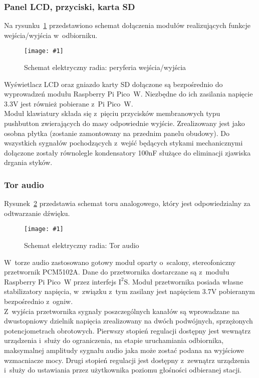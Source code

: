 \documentclass[polish]{aghengthesis}
\newcommand{\imgint}[4]{
	\begin{figure}[{#4}]
		\centering
		\texttt{[image: \#1]}
		\caption{#2}
		\label{#1}
	\end{figure}
}
\newcommand{\imgh}[3]{\imgint{#1}{#2}{#3}{H}}
\newcommand{\isqs}{$\text{I}^{2}\text{S}$}
\begin{document}
			\subsubsection{Panel LCD, przyciski, karta SD}
				Na rysunku~\ref{3/hw_kicad_sch_perip} przedstawiono schemat dołączenia modułów realizujących funkcje wejścia/wyjścia w~odbiorniku.
				\imgh{3/hw_kicad_sch_perip}{Schemat elektryczny radia: peryferia wejścia/wyjścia}{0.95}
				
				Wyświetlacz LCD oraz gniazdo karty SD dołączone są bezpośrednio do wyprowadzeń modułu Raspberry Pi Pico~W. Niezbędne do ich zasilania napięcie 3.3V jest również pobierane z~Pi Pico~W.
				$ $\\
				
				Moduł klawiatury składa się z~pięciu przycisków membranowych typu pushbutton zwierających do masy odpowiednie wyjście. Zrealizowany jest jako osobna płytka (zostanie zamontowany na przednim panelu obudowy).  Do wszystkich sygnałów pochodzących z~wejść będących stykami mechanicznymi dołączone zostały równolegle kondensatory 100nF służące do eliminacji zjawiska drgania styków.
				\pagebreak
				
			\subsubsection{Tor audio}
				Rysunek~\ref{3/hw_kicad_sch_audio} przedstawia schemat toru analogowego, który jest odpowiedzialny za odtwarzanie dźwięku.
				\imgh{3/hw_kicad_sch_audio}{Schemat elektryczny radia: Tor audio}{0.95}
				
				W~torze audio zastosowano gotowy moduł oparty o~scalony, stereofoniczny przetwornik PCM5102A\textsuperscript{\cite{hw_dac}}. Dane do przetwornika dostarczane są z~modułu Raspberry Pi Pico~W przez interfejs \isqs{}. Moduł przetwornika posiada własne stabilizatory napięcia, w~związku z~tym zasilany jest napięciem 3.7V pobieranym bezpośrednio z~ogniw.
				$ $\\
				
				Z~wyjścia przetwornika sygnały poszczególnych kanałów są wprowadzane na dwustopniowy dzielnik napięcia zrealizowany na dwóch podwójnych, sprzężonych potencjometrach obrotowych. Pierwszy stopień regulacji dostępny jest wewnątrz urządzenia i~służy do ograniczenia, na etapie uruchamiania odbiornika, maksymalnej amplitudy sygnału audio jaka może zostać podana na wyjściowe wzmacniacze mocy. Drugi stopień regulacji jest dostępny z~zewnątrz urządzenia i~służy do ustawiania przez użytkownika poziomu głośności odbieranej stacji. 
				$ $\\
				
\end{document}

